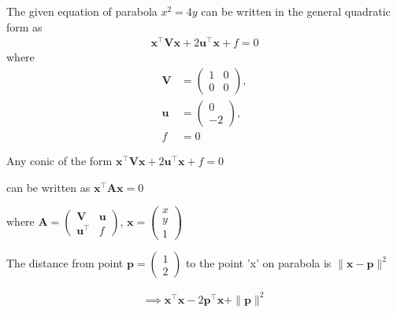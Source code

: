 \documentclass[journal,10pt,twocolumn]{article}
\let\vec\mathbf
\newcommand{\myvec}[1]{\ensuremath{\begin{pmatrix}#1\end{pmatrix}}}
\begin{document}
The given equation of parabola $x^2 = 4y$ can be written in the general quadratic form as
\begin{align}
    \label{eq:conic_quad_form}
    \vec{x}^{\top}\vec{V}\vec{x}+2\vec{u}^{\top}\vec{x}+f=0
    \end{align}
where
\begin{align}
	\label{eq:V_matrix}
	\vec{V} &= \myvec{1 & 0\\0 & 0},
	\\
	\label{eq:u_vector}
	\vec{u} &= \myvec{0\\-2},
	\\
	\label{eq:f_value}
	f &=0
\end{align}
\begin{center}
 Any conic of the form  $\vec{x^{\top}}\vec{V}\vec{x} + 2\vec{u^{\top}}\vec{x} + f = 0$ \end{center}
\begin{center} can be written as $\vec{x^{\top}}\vec{A}\vec{x} = 0$\end{center} 
\begin{center}
where $\vec{A} = \myvec{\vec{V}&\vec{u}\\\vec{u^{\top}}&f}$, $\vec{x} =\myvec{x\\y\\1}$
\end{center}
\begin{center}
The distance from point $\vec{p} = \myvec{1\\2}$ to the point 'x' on parabola is $\|\vec{x}-\vec{p}\|^2$
\end{center}

\begin{gather*}
	\implies \vec{x^{\top}}\vec{x} - 2\vec{p^{\top}}\vec{x} + \|\vec{p}\|^2
\end{gather*}
\end{document}
